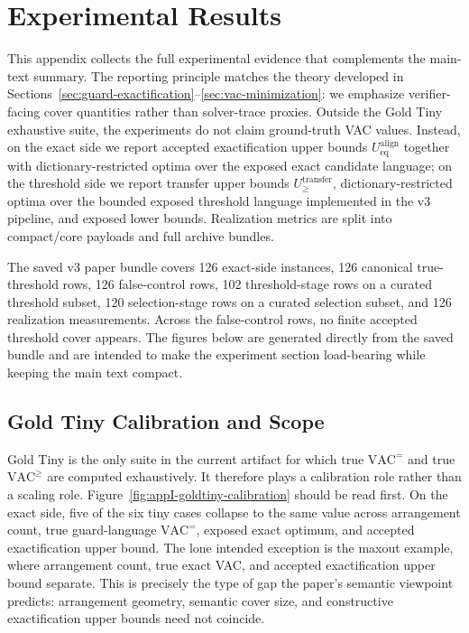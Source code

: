 
\section{Experimental Results}
\label{app:experiments}

\setcounter{figure}{0}
\renewcommand{\thefigure}{\thesection.\arabic{figure}}

This appendix collects the full experimental evidence that complements the main-text summary. The reporting principle matches the theory developed in Sections~\ref{sec:guard-exactification}--\ref{sec:vac-minimization}: we emphasize verifier-facing cover quantities rather than solver-trace proxies. Outside the Gold Tiny exhaustive suite, the experiments do not claim ground-truth VAC values. Instead, on the exact side we report accepted exactification upper bounds $U_{\mathrm{eq}}^{\mathrm{align}}$ together with dictionary-restricted optima over the exposed exact candidate language; on the threshold side we report transfer upper bounds $U_{\ge}^{\mathrm{transfer}}$, dictionary-restricted optima over the bounded exposed threshold language implemented in the v3 pipeline, and exposed lower bounds. Realization metrics are split into compact/core payloads and full archive bundles.

The saved v3 paper bundle covers 126 exact-side instances, 126 canonical true-threshold rows, 126 false-control rows, 102 threshold-stage rows on a curated threshold subset, 120 selection-stage rows on a curated selection subset, and 126 realization measurements. Across the false-control rows, no finite accepted threshold cover appears. The figures below are generated directly from the saved bundle and are intended to make the experiment section load-bearing while keeping the main text compact.

\subsection{Gold Tiny Calibration and Scope}

Gold Tiny is the only suite in the current artifact for which true $\mathrm{VAC}^{=}$ and true $\mathrm{VAC}^{\ge}$ are computed exhaustively. It therefore plays a calibration role rather than a scaling role. Figure~\ref{fig:appI-goldtiny-calibration} should be read first. On the exact side, five of the six tiny cases collapse to the same value across arrangement count, true guard-language $\mathrm{VAC}^{=}$, exposed exact optimum, and accepted exactification upper bound. The lone intended exception is the maxout example, where arrangement count, true exact VAC, and accepted exactification upper bound separate. This is precisely the type of gap the paper's semantic viewpoint predicts: arrangement geometry, semantic cover size, and constructive exactification upper bounds need not coincide.

